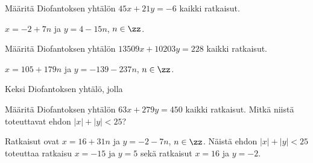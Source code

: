\begin{tehtava}
    Määritä Diofantoksen yhtälön $45x + 21y = -6$ kaikki ratkaisut.

    \begin{vastaus}
        $x = -2 + 7n$ ja $y = 4 - 15n$, $n\in\zz$.
    \end{vastaus}
    
\end{tehtava}

\begin{tehtava}
    Määritä Diofantoksen yhtälön $13509x + 10203y = 228$ kaikki ratkaisut.
    
    \begin{vastaus}
        $x = 105 + 179n$ ja $y = -139 - 237n$, $n\in\zz$.
    \end{vastaus}
    
\end{tehtava}

\begin{tehtava}
    Keksi Diofantoksen yhtälö, jolla
    \begin{alakohdat}
    \end{alakohdat}

    \begin{vastaus}
        \begin{alakohdat}
        \end{alakohdat}
    \end{vastaus}
    
\end{tehtava}

\begin{tehtava}
    Määritä Diofantoksen yhtälön $63x + 279y = 450$ kaikki ratkaisut. Mitkä niistä toteuttavat ehdon $|x| + |y| < 25$?
    
    \begin{vastaus}
        Ratkaisut ovat $x = 16 + 31n$ ja $y = -2 - 7n$, $n\in\zz$. Näistä ehdon $|x| + |y| < 25$ toteuttaa ratkaisu $x = -15$ ja $y = 5$ sekä ratkaisut $x = 16$ ja $y = -2$.
    \end{vastaus}
    
\end{tehtava}

